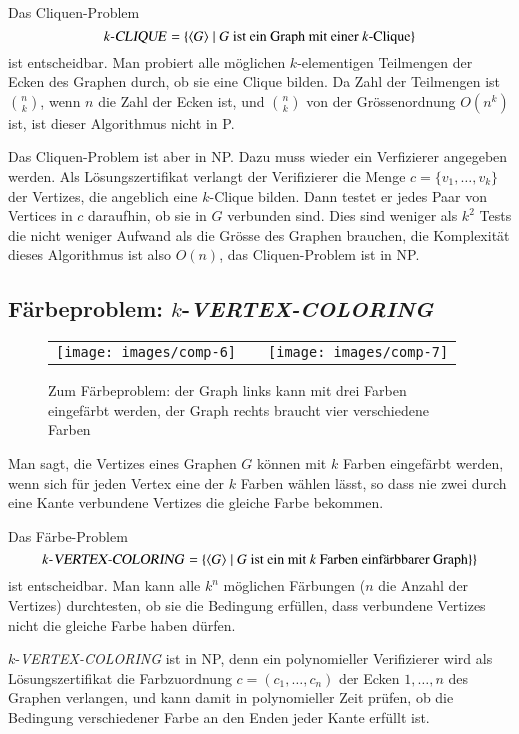 Das Cliquen-Problem
\[
\text{$k$-\textsl{CLIQUE}} = \{ \langle G\rangle\;|\;
\text{$G$ ist ein Graph mit einer $k$-Clique}\}
\]
ist entscheidbar. Man probiert alle möglichen $k$-elementigen
Teilmengen der Ecken des Graphen durch, ob sie eine Clique
bilden. Da Zahl der Teilmengen ist $\binom{n}{k}$, wenn $n$
die Zahl der Ecken ist, und $\binom{n}{k}$ von der Grössenordnung
$O(n^k)$ ist, ist dieser Algorithmus nicht in P.

Das Cliquen-Problem ist aber in NP. Dazu muss wieder ein
Verfizierer angegeben werden. Als Lösungszertifikat verlangt
der Verifizierer die Menge $c=\{v_1,\dots,v_k\}$ der
Vertizes, die angeblich eine $k$-Clique bilden. Dann testet
er jedes Paar von Vertices in $c$ daraufhin, ob sie in $G$
verbunden sind. Dies sind weniger als $k^2$ Tests die nicht
weniger Aufwand als die Grösse des Graphen brauchen, die
Komplexität dieses Algorithmus ist also $O(n)$, das
Cliquen-Problem ist in NP.

\subsection{Färbeproblem: \texorpdfstring{$k$}{k}-\textsl{VERTEX-COLORING}}
%
\begin{figure}
\begin{center}
\begin{tabular}{ccc}
\texttt{[image: images/comp-6]}&
\qquad&\qquad
\texttt{[image: images/comp-7]}
\end{tabular}
\end{center}
\caption{Zum Färbeproblem: der Graph links kann mit drei Farben
eingefärbt werden, der Graph rechts braucht vier verschiedene Farben
\label{vertex-coloring-examples}}
\end{figure}%
%
Man sagt, die Vertizes eines Graphen $G$ können mit $k$ Farben
eingefärbt werden, wenn sich für jeden Vertex eine der $k$ Farben
wählen lässt, so dass nie zwei durch eine Kante verbundene Vertizes
die gleiche Farbe bekommen.

Das Färbe-Problem 
\[
\text{$k$-\textsl{VERTEX-COLORING}}
=
\{
\langle G\rangle\;|\;
\text{$G$ ist ein mit $k$ Farben einfärbbarer Graph}\}
\}
\]
ist entscheidbar. Man kann alle $k^n$ möglichen Färbungen
($n$ die Anzahl der Vertizes) durchtesten, ob sie die Bedingung
erfüllen, dass verbundene Vertizes nicht die gleiche Farbe haben
dürfen.

$k$-\textsl{VERTEX-COLORING} ist in NP, denn ein polynomieller Verifizierer
wird als Lösungszertifikat die Farbzuordnung $c=(c_1,\dots,c_n)$ der
Ecken $1,\dots,n$ des Graphen verlangen, und kann damit in polynomieller
Zeit prüfen, ob die Bedingung verschiedener Farbe an den Enden
jeder Kante erfüllt ist.

